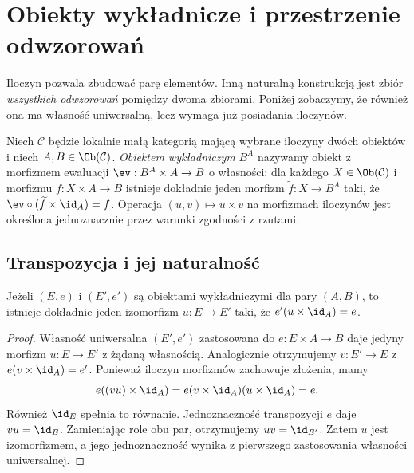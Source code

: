 \providecommand{\atlasref}[2]{#2}
\section{Obiekty wykładnicze i przestrzenie odwzorowań}\label{sec:exponentials}

Iloczyn pozwala zbudować parę elementów. Inną naturalną konstrukcją jest zbiór \emph{wszystkich odwzorowań} pomiędzy dwoma zbiorami. Poniżej zobaczymy, że również ona ma własność uniwersalną, lecz wymaga już posiadania iloczynów.

\begin{definicja}\label{def:exponential}
Niech $\mathcal C$ będzie lokalnie małą kategorią mającą wybrane iloczyny dwóch obiektów i niech $A,B\in\Ob(\mathcal C)$. \emph{Obiektem wykładniczym} $B^A$ nazywamy obiekt z morfizmem ewaluacji $\ev:B^A\times A\to B$ o własności: dla każdego $X\in\Ob(\mathcal C)$ i morfizmu $f:X\times A\to B$ istnieje dokładnie jeden morfizm $\widetilde f:X\to B^A$ taki, że $\ev\circ(\widetilde f\times\id_A)=f$. Operacja $(u,v)\mapsto u\times v$ na morfizmach iloczynów jest określona jednoznacznie przez warunki zgodności z rzutami.
\end{definicja}

\subsection{Transpozycja i jej naturalność}

\begin{twierdzenie}\label{cat:thm:exp-unique}
Jeżeli $(E,e)$ i $(E',e')$ są obiektami wykładniczymi dla pary $(A,B)$, to istnieje dokładnie jeden izomorfizm $u:E\to E'$ taki, że $e'(u\times\id_A)=e$.
\end{twierdzenie}
\begin{proof}
Własność uniwersalna $(E',e')$ zastosowana do $e:E\times A\to B$ daje jedyny morfizm $u:E\to E'$ z żądaną własnością. Analogicznie otrzymujemy $v:E'\to E$ z $e(v\times\id_A)=e'$. Ponieważ iloczyn morfizmów zachowuje złożenia, mamy
\[
e((vu)\times\id_A)
=e(v\times\id_A)(u\times\id_A)=e.
\]
Również $\id_E$ spełnia to równanie. Jednoznaczność transpozycji $e$ daje $vu=\id_E$. Zamieniając role obu par, otrzymujemy $uv=\id_{E'}$. Zatem $u$ jest izomorfizmem, a jego jednoznaczność wynika z pierwszego zastosowania własności uniwersalnej.
\end{proof}

